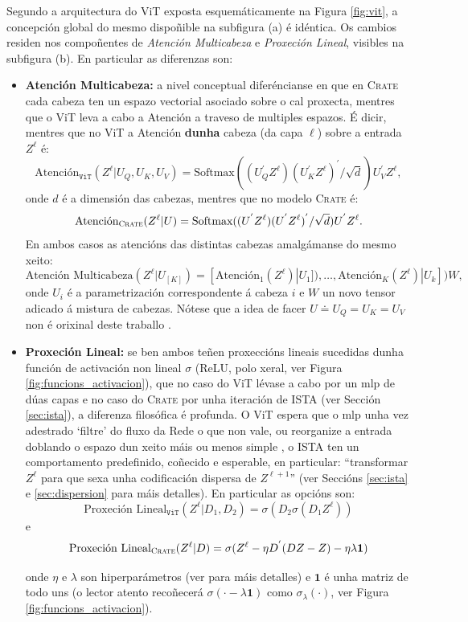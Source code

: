 Segundo a arquitectura do ViT exposta esquemáticamente na Figura \ref{fig:vit}, a concepción global do mesmo dispoñible na subfigura (a) é idéntica. Os cambios residen nos compoñentes de \emph{Atención Multicabeza} e \emph{Proxeción Lineal}, visibles na subfigura (b). En particular as diferenzas son:
\begin{itemize}
				\item \textbf{Atención Multicabeza:} a nivel conceptual diferéncianse en que en \textsc{Crate} cada cabeza ten un espazo vectorial asociado sobre o cal proxecta, mentres que o ViT leva a cabo a Atención a traveso de multiples espazos. É dicir, mentres que no ViT a Atención \textbf{dunha} cabeza (da capa $\ell$) sobre a entrada $Z^\ell$ é:
								\[\text{Atención}_{\texttt{ViT}}(Z^\ell | U_Q, U_K, U_V) = \text{Softmax}((U_Q^{'} Z^\ell)(U_K^{'} Z^\ell)^{'}/\sqrt{d})U_V^{'}Z^\ell,\]
onde $d$ é a dimensión das cabezas, mentres que no modelo \textsc{Crate} é:
								\[\text{Atención}_{\textsc{Crate}}(Z^\ell | U) = \text{Softmax}((U^{'} Z^\ell)(U^{'} Z^\ell)^{'}/\sqrt{d})U^{'}Z^\ell.\]
En ambos casos as atencións das distintas cabezas amalgámanse do mesmo xeito:
\[\text{Atención Multicabeza}(Z^\ell | U_{[K]}) = [\text{Atención}_1(Z^\ell) | U_1]), \dots , \text{Atención}_K(Z^\ell) | U_k]) W,\]
onde $U_i$ é a parametrización correspondente á cabeza $i$ e $W$ un novo tensor adicado á mistura de cabezas. Nótese que a idea de facer $U \doteq U_Q = U_K = U_V$ non é orixinal deste traballo \cite{hinton21}.
\item \textbf{Proxeción Lineal:} se ben ambos teñen proxeccións lineais sucedidas dunha función de activación non lineal $\sigma$ (ReLU, polo xeral, ver Figura \ref{fig:funcions_activacion}), que no caso do ViT lévase a cabo por un \acrshort{mlp} de dúas capas e no caso do \textsc{Crate} por unha iteración de ISTA (ver Sección \ref{sec:ista}), a diferenza filosófica é profunda. O ViT espera que o \acrshort{mlp} unha vez adestrado `filtre' do fluxo da Rede o que non vale, ou reorganize a entrada doblando o espazo dun xeito máis ou menos simple \cite{dlbook,hands}, o ISTA ten un comportamento predefinido, coñecido e esperable, en particular: ``transformar $Z^\ell$ para que sexa unha codificación dispersa de $Z^{\ell +1}$'' (ver Seccións \ref{sec:ista} e \ref{sec:dispersion} para máis detalles). En particular as opcións son:
				\[\text{Proxeción Lineal}_\texttt{ViT}(Z^\ell | D_1, D_2) = \sigma(D_2\sigma(D_1 Z^\ell))\]
e
\[\text{Proxeción Lineal}_\textsc{Crate}(Z^\ell | D) = \sigma(Z^\ell - \eta D^{'}(DZ-Z)-\eta\lambda \mathbf{1})\]

onde $\eta$ e $\lambda$ son hiperparámetros (ver \cite{crate} para máis detalles) e $\mathbf{1}$ é unha matriz de todo uns (o lector atento recoñecerá $\sigma(\cdot -\lambda\mathbf{1})$ como $\sigma_{\lambda}(\cdot)$, ver Figura \ref{fig:funcions_activacion}).
\end{itemize}


